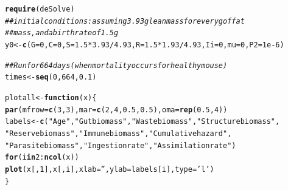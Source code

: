 \documentclass[12pt,reqno,final,pdftex]{amsart}\usepackage[]{graphicx}\usepackage[]{color}
\makeatletter
\newcommand{\hlnum}[1]{\textcolor[rgb]{0.686,0.059,0.569}{#1}}%
\newcommand{\hlstr}[1]{\textcolor[rgb]{0.192,0.494,0.8}{#1}}%
\newcommand{\hlcom}[1]{\textcolor[rgb]{0.678,0.584,0.686}{\textit{#1}}}%
\newcommand{\hlopt}[1]{\textcolor[rgb]{0,0,0}{#1}}%
\newcommand{\hlstd}[1]{\textcolor[rgb]{0.345,0.345,0.345}{#1}}%
\newcommand{\hlkwa}[1]{\textcolor[rgb]{0.161,0.373,0.58}{\textbf{#1}}}%
\newcommand{\hlkwb}[1]{\textcolor[rgb]{0.69,0.353,0.396}{#1}}%
\newcommand{\hlkwc}[1]{\textcolor[rgb]{0.333,0.667,0.333}{#1}}%
\newcommand{\hlkwd}[1]{\textcolor[rgb]{0.737,0.353,0.396}{\textbf{#1}}}%
\newenvironment{kframe}{%
 \def\at@end@of@kframe{}%
 \ifinner\ifhmode%
  \def\at@end@of@kframe{\end{minipage}}%
  \begin{minipage}{\columnwidth}%
 \fi\fi%
 \def\FrameCommand##1{\hskip\@totalleftmargin \hskip-\fboxsep
 \colorbox{shadecolor}{##1}\hskip-\fboxsep
     \hskip-\linewidth \hskip-\@totalleftmargin \hskip\columnwidth}%
 \MakeFramed {\advance\hsize-\width
   \@totalleftmargin\z@ \linewidth\hsize
   \@setminipage}}%
 {\par\unskip\endMakeFramed%
 \at@end@of@kframe}
\newenvironment{knitrout}{}{} %
\theoremstyle{plain}
\numberwithin{equation}{part}
\makeatother
\begin{document}
\begin{knitrout}\scriptsize
{}\color{fgcolor}\begin{kframe}
\begin{alltt}
\hlkwd{require}\hlstd{(deSolve)}
\hlcom{## initial conditions: assuming 3.93g lean mass for every g of fat}
\hlcom{## mass, and a birth rate of 1.5 g}
\hlstd{y0} \hlkwb{<-} \hlkwd{c}\hlstd{(}\hlkwc{G}\hlstd{=}\hlnum{0}\hlstd{,} \hlkwc{C}\hlstd{=}\hlnum{0}\hlstd{,} \hlkwc{S}\hlstd{=}\hlnum{1.5}\hlopt{*}\hlnum{3.93}\hlopt{/}\hlnum{4.93}\hlstd{,} \hlkwc{R}\hlstd{=}\hlnum{1.5}\hlopt{*}\hlnum{1.93}\hlopt{/}\hlnum{4.93}\hlstd{,} \hlkwc{Ii}\hlstd{=}\hlnum{0}\hlstd{,} \hlkwc{mu}\hlstd{=}\hlnum{0}\hlstd{,} \hlkwc{P2}\hlstd{=}\hlnum{1e-6}\hlstd{)}

\hlcom{## Run for 664 days (when mortality occurs for healthy mouse)}
\hlstd{times} \hlkwb{<-} \hlkwd{seq}\hlstd{(}\hlnum{0}\hlstd{,} \hlnum{664}\hlstd{,} \hlnum{0.1}\hlstd{)}

\hlstd{plotall} \hlkwb{<-} \hlkwa{function}\hlstd{(}\hlkwc{x}\hlstd{) \{}
    \hlkwd{par}\hlstd{(}\hlkwc{mfrow}\hlstd{=}\hlkwd{c}\hlstd{(}\hlnum{3}\hlstd{,}\hlnum{3}\hlstd{),} \hlkwc{mar}\hlstd{=}\hlkwd{c}\hlstd{(}\hlnum{2}\hlstd{,}\hlnum{4}\hlstd{,}\hlnum{0.5}\hlstd{,}\hlnum{0.5}\hlstd{),} \hlkwc{oma}\hlstd{=}\hlkwd{rep}\hlstd{(}\hlnum{0.5}\hlstd{,}\hlnum{4}\hlstd{))}
    \hlstd{labels} \hlkwb{<-} \hlkwd{c}\hlstd{(}\hlstr{"Age"}\hlstd{,} \hlstr{"Gut biomass"}\hlstd{,} \hlstr{"Waste biomass"}\hlstd{,} \hlstr{"Structure biomass"}\hlstd{,}
                \hlstr{"Reserve biomass"}\hlstd{,} \hlstr{"Immune biomass"}\hlstd{,} \hlstr{"Cumulative hazard"}\hlstd{,}
                \hlstr{"Parasite biomass"}\hlstd{,} \hlstr{"Ingestion rate"}\hlstd{,} \hlstr{"Assimilation rate"}\hlstd{)}
    \hlkwa{for} \hlstd{(i} \hlkwa{in} \hlnum{2}\hlopt{:}\hlkwd{ncol}\hlstd{(x))}
        \hlkwd{plot}\hlstd{(x[,}\hlnum{1}\hlstd{], x[,i],} \hlkwc{xlab}\hlstd{=}\hlstr{''}\hlstd{,} \hlkwc{ylab}\hlstd{=labels[i],} \hlkwc{type}\hlstd{=}\hlstr{'l'}\hlstd{)}
\hlstd{\}}


\end{alltt}
\end{kframe}
\end{knitrout}
\end{document}
